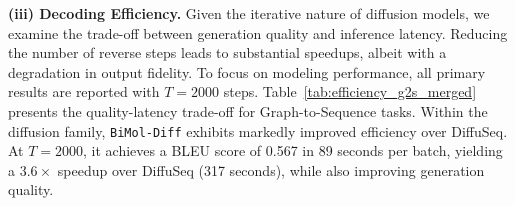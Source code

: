 \noindent \textbf{(iii) Decoding Efficiency.} Given the iterative nature of diffusion models, we examine the trade-off between generation quality and inference latency. Reducing the number of reverse steps leads to substantial speedups, albeit with a degradation in output fidelity. To focus on modeling performance, all primary results are reported with $T{=}2000$ steps. Table~\ref{tab:efficiency_g2s_merged} presents the quality-latency trade-off for Graph-to-Sequence tasks. Within the diffusion family, \texttt{BiMol-Diff} exhibits markedly improved efficiency over DiffuSeq. At $T{=}2000$, it achieves a BLEU score of 0.567 in 89 seconds per batch, yielding a $3.6\times$ speedup over DiffuSeq (317 seconds), while also improving generation quality.
\begin{table}[ht!]
\centering
\small
\setlength{\tabcolsep}{4pt}
\renewcommand{\arraystretch}{1.2}

\caption{Inference efficiency comparison on the G2S task. We compare \texttt{BiMol-Diff} against the best Autoregressive (AR) and Diffusion baselines from Table \ref{molecule captioning}. Time is measured as total inference time for a batch size of 50 on a single NVIDIA V100 GPU.}
\label{tab:efficiency_g2s_merged}

\end{table}
